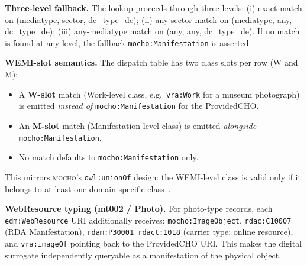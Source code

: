 \noindent
\textbf{Three-level fallback.}
The lookup proceeds through three levels:
(i) exact match on (mediatype, sector, dc\_type\_de);
(ii) any-sector match on (mediatype, any, dc\_type\_de);
(iii) any-mediatype match on (any, any, dc\_type\_de).
If no match is found at any level, the fallback \texttt{mocho:Manifestation}
is asserted.

\noindent
\textbf{WEMI-slot semantics.}
The dispatch table has two class slots per row (W and M):
\begin{itemize}
  \item A \textbf{W-slot} match (Work-level class, e.g.\ \texttt{vra:Work}
        for a museum photograph) is emitted \emph{instead of}
        \texttt{mocho:Manifestation} for the ProvidedCHO.
  \item An \textbf{M-slot} match (Manifestation-level class) is emitted
        \emph{alongside} \texttt{mocho:Manifestation}.
  \item No match defaults to \texttt{mocho:Manifestation} only.
\end{itemize}

This mirrors \textsc{mocho}'s \texttt{owl:unionOf} design: the WEMI-level
class is valid only if it belongs to at least one domain-specific
class~\cite{tan2026mocho}.

\noindent
\textbf{WebResource typing (mt002 / Photo).}
For photo-type records, each \texttt{edm:WebResource} URI additionally
receives:
\texttt{mocho:ImageObject}, \texttt{rdac:C10007} (RDA Manifestation),
\texttt{rdam:P30001 rdact:1018} (carrier type: online resource), and
\texttt{vra:imageOf} pointing back to the ProvidedCHO URI.
This makes the digital surrogate independently queryable as a manifestation
of the physical object.
